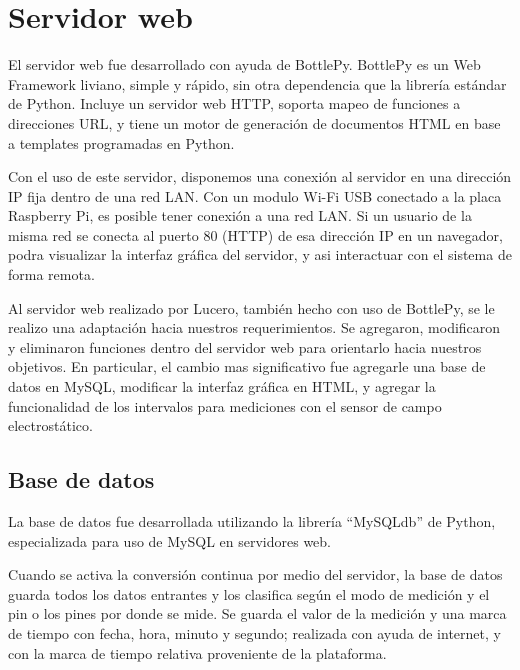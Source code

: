 
\section{Servidor web} %
\label{it7:sec:servidor_web}

El servidor web fue desarrollado con ayuda de BottlePy. BottlePy es un Web Framework liviano, simple y rápido, sin otra dependencia que la librería estándar de Python. Incluye un servidor web HTTP, soporta mapeo de funciones a direcciones URL, y tiene un motor de generación de documentos HTML en base a templates programadas en Python.

Con el uso de este servidor, disponemos una conexión al servidor en una dirección IP fija dentro de una red LAN. Con un modulo Wi-Fi USB conectado a la placa Raspberry Pi, es posible tener conexión a una red LAN. Si un usuario de la misma red se conecta al puerto 80 (HTTP) de esa dirección IP en un navegador, podra visualizar la interfaz gráfica del servidor, y asi interactuar con el sistema de forma remota.

Al servidor web realizado por Lucero, también hecho con uso de BottlePy, se le realizo una adaptación hacia nuestros requerimientos. Se agregaron, modificaron y eliminaron funciones dentro del servidor web para orientarlo hacia nuestros objetivos. En particular, el cambio mas significativo fue agregarle una base de datos en MySQL, modificar la interfaz gráfica en HTML, y agregar la funcionalidad de los intervalos para mediciones con el sensor de campo electrostático.


\subsection{Base de datos} %
\label{it7:sub:base_de_datos}

La base de datos fue desarrollada utilizando la librería ``MySQLdb'' de Python, especializada para uso de MySQL en servidores web.

Cuando se activa la conversión continua por medio del servidor, la base de datos guarda todos los datos entrantes y los clasifica según el modo de medición y el pin o los pines por donde se mide. Se guarda el valor de la medición y una marca de tiempo con fecha, hora, minuto y segundo; realizada con ayuda de internet, y con la marca de tiempo relativa proveniente de la plataforma.

